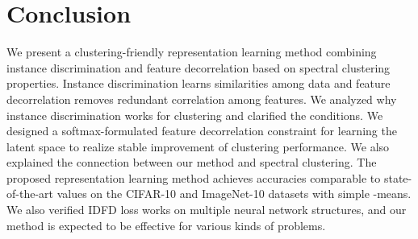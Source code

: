 \documentclass{article} \usepackage{iclr2021_conference,times}
\begin{document}
\begin{table}[h]
  \caption{Clustering results (\%) on various network architectures.}
  \label{tab:results-archtecture}
  \centering
\end{table}


\section{Conclusion}
We present a clustering-friendly representation learning method combining instance discrimination and feature decorrelation based on spectral clustering properties.
Instance discrimination learns similarities among data and feature decorrelation removes redundant correlation among features. We analyzed why instance discrimination works for clustering and clarified the conditions. We designed a softmax-formulated feature decorrelation constraint for learning the latent space to realize stable improvement of clustering performance. We also explained the connection between our method and spectral clustering.
The proposed representation learning method achieves accuracies comparable to state-of-the-art values on the CIFAR-10 and ImageNet-10 datasets with simple -means. 
We also verified IDFD loss works on multiple neural network structures, and our method is expected to be effective for various kinds of problems. 
\end{document}
